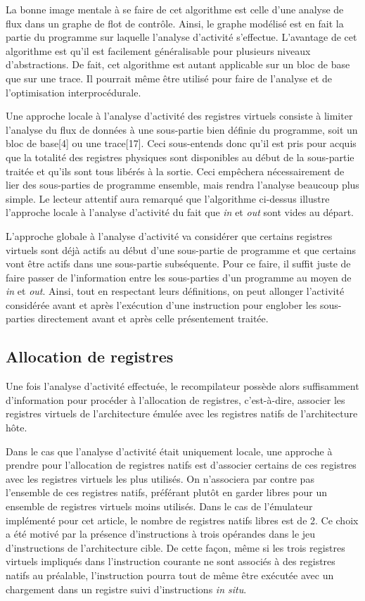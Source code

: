 \documentclass{article} %
\begin{document}
La bonne image mentale à se faire de cet algorithme est celle d'une analyse de flux dans un graphe de flot de contrôle. Ainsi, le graphe modélisé est en fait la partie du programme sur laquelle l'analyse d'activité s'effectue. L'avantage de cet algorithme est qu'il est facilement généralisable pour plusieurs niveaux d'abstractions. De fait, cet algorithme est autant applicable sur un bloc de base que sur une trace. Il pourrait même être utilisé pour faire de l'analyse et de l'optimisation interprocédurale.

Une approche locale à l'analyse d'activité des registres virtuels consiste à limiter l'analyse du flux de données à une sous-partie bien définie du programme, soit un bloc de base[4] ou une trace[17]. Ceci sous-entends donc qu'il est pris pour acquis que la totalité des registres physiques sont disponibles au début de la sous-partie traitée et qu'ils sont tous libérés à la sortie. Ceci empêchera nécessairement de lier des sous-parties de programme ensemble, mais rendra l'analyse beaucoup plus simple. Le lecteur attentif aura remarqué que l'algorithme ci-dessus illustre l'approche locale à l'analyse d'activité du fait que \textit{in} et \textit{out} sont vides au départ.

L'approche globale à l'analyse d'activité va considérer que certains registres virtuels sont déjà actifs au début d'une sous-partie de programme et que certains vont être actifs dans une sous-partie subséquente. Pour ce faire, il suffit juste de faire passer de l'information entre les sous-parties d'un programme au moyen de \textit{in} et \textit{out}. Ainsi, tout en respectant leurs définitions, on peut allonger l'activité considérée avant et après l'exécution d'une instruction pour englober les sous-parties directement avant et après celle présentement traitée.

\subsection{Allocation de registres}
Une fois l'analyse d'activité effectuée, le recompilateur possède alors suffisamment d'information pour procéder à l'allocation de registres, c'est-à-dire, associer les registres virtuels de l'architecture émulée avec les registres natifs de l'architecture hôte.

Dans le cas que l'analyse d'activité était uniquement locale, une approche à prendre pour l'allocation de registres natifs est d'associer certains de ces registres avec les registres virtuels les plus utilisés. On n'associera par contre pas l'ensemble de ces registres natifs, préférant plutôt en garder libres pour un ensemble de registres virtuels moins utilisés. Dans le cas de l'émulateur implémenté pour cet article, le nombre de registres natifs libres est de 2. Ce choix a été motivé par la présence d'instructions à trois opérandes dans le jeu d'instructions de l'architecture cible. De cette façon, même si les trois registres virtuels impliqués dans l'instruction courante ne sont associés à des registres natifs au préalable, l'instruction pourra tout de même être exécutée avec un chargement dans un registre suivi d'instructions \textit{in situ}.
\end{document}
